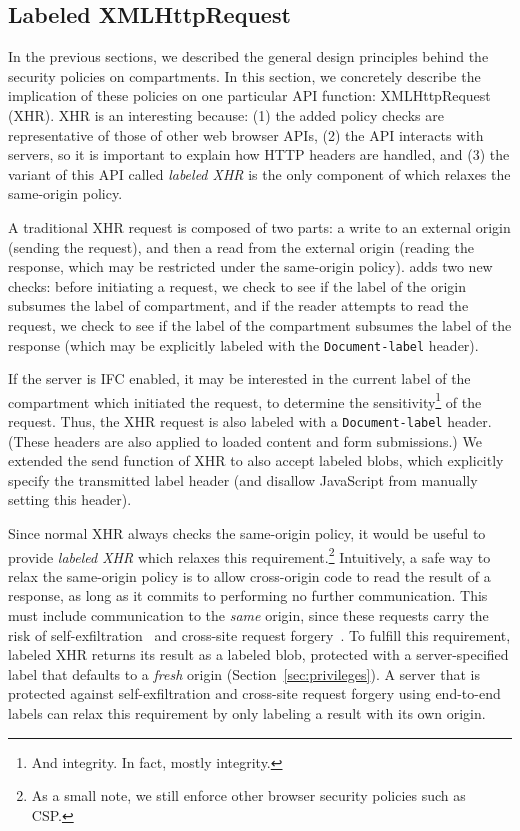 \subsection{Labeled XMLHttpRequest}
\label{sec:labeled-xhr}

In the previous sections, we described the general design principles
behind the security policies on compartments.
%
In this section, we concretely describe the implication of these
policies on one particular API function: XMLHttpRequest (XHR).
%
XHR is an interesting because: (1) the added \sys{} policy checks are
representative of those of other web browser APIs, (2) the API
interacts with servers, so it is important to explain how HTTP headers are
handled, and (3) the variant of this API called \emph{labeled XHR} is
the only component of \sys{} which relaxes the same-origin policy.

A traditional XHR request is composed of two parts: a write to an
external origin (sending the request), and then a read from the external
origin (reading the response, which may be restricted under the
same-origin policy).
%
\sys{} adds two new checks: before initiating a
request, we check to see if the label of the origin subsumes the label
of compartment, and if the reader attempts to read the request, we check
to see if the label of the compartment subsumes the label of the response
(which may be explicitly labeled with the {\tt Document-label} header).

If the server is IFC enabled, it may be interested in the current label
of the compartment which initiated the request, to determine the
sensitivity\footnote{And integrity. In fact, mostly integrity.} of the request.
%
Thus, the XHR request is also labeled with a {\tt Document-label} header.
%
(These headers are also applied to loaded content and form submissions.)
%
We extended the send function of XHR to also accept labeled blobs,
which explicitly specify the transmitted label header (and disallow
JavaScript from manually setting this header).

Since normal XHR always checks the same-origin policy, it would be
useful to provide \emph{labeled XHR} which relaxes this requirement.\footnote{As a small note, we still enforce other browser security policies such as CSP.}
%
Intuitively, a safe way to relax the same-origin policy is to allow
cross-origin code to read the result of a response, as long as it
commits to performing no further communication.
%
This must include communication to the \emph{same} origin, since these requests
carry the risk of self-exfiltration~\cite{selfex} and cross-site request
forgery~\cite{CSRF}.
%
To fulfill this requirement, labeled XHR returns its result as a labeled
blob, protected with a server-specified label that defaults to a \emph{fresh}
origin (Section~\ref{sec:privileges}).
%
A server that is protected against self-exfiltration and cross-site
request forgery using end-to-end labels can relax this requirement by
only labeling a result with its own origin.

